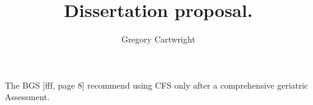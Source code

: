 \documentclass[12pt]{article}
\begin{document}
\author{Gregory Cartwright}
\title{Dissertation proposal.}
\maketitle
The BGS [fff, page 8] recommend using CFS only after a comprehensive geriatric Assessment.
\end{document}
